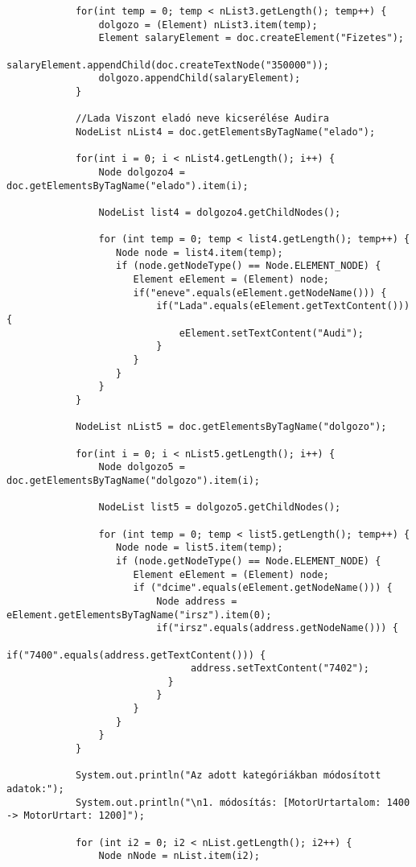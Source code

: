 \documentclass[14pt]{extarticle}
\begin{document}
\begin{normalsize}
\begin{verbatim}
			for(int temp = 0; temp < nList3.getLength(); temp++) {
				dolgozo = (Element) nList3.item(temp);
				Element salaryElement = doc.createElement("Fizetes");
				salaryElement.appendChild(doc.createTextNode("350000"));
				dolgozo.appendChild(salaryElement);
			}
			
			//Lada Viszont eladó neve kicserélése Audira
			NodeList nList4 = doc.getElementsByTagName("elado");
			
			for(int i = 0; i < nList4.getLength(); i++) {
				Node dolgozo4 = doc.getElementsByTagName("elado").item(i);
		        
		        NodeList list4 = dolgozo4.getChildNodes();
		        
		        for (int temp = 0; temp < list4.getLength(); temp++) {
		           Node node = list4.item(temp);
		           if (node.getNodeType() == Node.ELEMENT_NODE) {
		              Element eElement = (Element) node;
		              if("eneve".equals(eElement.getNodeName())) {
		            	  if("Lada".equals(eElement.getTextContent())) {
		            		  eElement.setTextContent("Audi");
		            	  }
		              }
		           }
		        }
			}
			
			NodeList nList5 = doc.getElementsByTagName("dolgozo");
			
			for(int i = 0; i < nList5.getLength(); i++) {
				Node dolgozo5 = doc.getElementsByTagName("dolgozo").item(i);
		        
		        NodeList list5 = dolgozo5.getChildNodes();
		        
		        for (int temp = 0; temp < list5.getLength(); temp++) {
		           Node node = list5.item(temp);
		           if (node.getNodeType() == Node.ELEMENT_NODE) {
		              Element eElement = (Element) node;
		              if ("dcime".equals(eElement.getNodeName())) {
		            	  Node address = eElement.getElementsByTagName("irsz").item(0);
		            	  if("irsz".equals(address.getNodeName())) {
		            		 if("7400".equals(address.getTextContent())) {
		                	 	address.setTextContent("7402");
		                 	}
		            	  }
		              }
		           }
		        }
			}
			
			System.out.println("Az adott kategóriákban módosított adatok:");
			System.out.println("\n1. módosítás: [MotorUrtartalom: 1400 -> MotorUrtart: 1200]");
			
			for (int i2 = 0; i2 < nList.getLength(); i2++) {
	            Node nNode = nList.item(i2);


\end{verbatim}
\end{normalsize}
\end{document}
